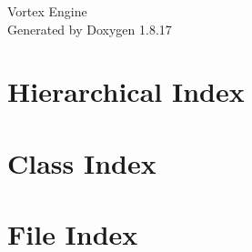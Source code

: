 \let\mypdfximage\pdfximage\def\pdfximage{\immediate\mypdfximage}\documentclass[twoside]{book}
\newcommand{\+}{\discretionary{\mbox{\scriptsize$\hookleftarrow$}}{}{}}
\newcommand{\clearemptydoublepage}{%
  \newpage{\pagestyle{empty}\cleardoublepage}%
}
\begin{document}
\hypersetup{pageanchor=false,
             bookmarksnumbered=true,
             pdfencoding=unicode
            }
\begin{titlepage}
\vspace*{7cm}
\begin{center}%
{\Large Vortex Engine }\\
\vspace*{1cm}
{\large Generated by Doxygen 1.8.17}\\
\end{center}
\end{titlepage}
\clearemptydoublepage
{}
\tableofcontents
\clearemptydoublepage
{}
\hypersetup{pageanchor=true}

\chapter{Hierarchical Index}

\chapter{Class Index}

\chapter{File Index}

\end{document}
